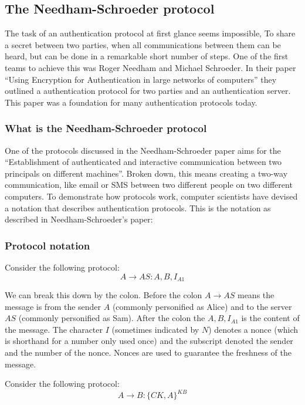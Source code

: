\documentclass{article}
\begin{document}
\subsection{The Needham-Schroeder protocol}
The task of an authentication protocol at first glance seems impossible, To
share a secret between two parties, when all communications between them can be
heard, but can be done in a remarkable short number of steps. One of the first
teams to achieve this was Roger Needham and Michael Schroeder. In their paper
“Using Encryption for Authentication in large networks of computers” they
outlined a authentication protocol for two parties and an authentication server.
This paper was a foundation for many authentication protocols today.

\subsubsection{What is the Needham-Schroeder protocol}
One of the protocols discussed in the Needham-Schroeder paper aims for the
“Establishment of authenticated and interactive communication between two
principals on different machines”. Broken down, this means creating a two-way
communication, like email or SMS between two different people on two different
computers. To demonstrate how protocols work, computer scientists have devised a
notation that describes authentication protocols. This is the notation as
described in Needham-Schroeder’s paper:

\subsubsection{Protocol notation}
Consider the following protocol:
\begin{equation}
    A \rightarrow AS: A, B, I_{A1}
\end{equation}

\noindent We can break this down by the colon. Before the colon $A \rightarrow AS$ means
the message is from the sender $A$ (commonly personified as Alice) and to the
server $AS$ (commonly personified as Sam). After the colon the $A, B, I_{A1}$ is
the content of the message. The character $I$ (sometimes indicated by $N$)
denotes a nonce (which is shorthand for a number only used once) and the
subscript denoted the sender and the number of the nonce. Nonces are used to
guarantee the freshness of the message.

\medskip

\noindent Consider the following protocol:
\begin{equation}
    A \rightarrow B: \{CK, A\}^{KB}
\end{equation}
\end{document}
